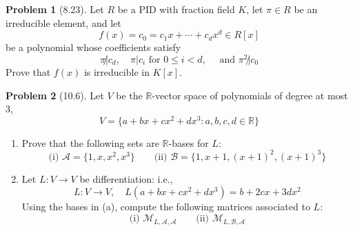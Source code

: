 \documentclass[12pt]{article}
\theoremstyle{definition}
\newtheorem{problem}{Problem}
\begin{document}
\begin{problem}[8.23]
    Let $R$ be a PID with fraction field $K$, let $\pi \in R$ be an irreducible element, and let
    \[
        f(x) = c_0 = c_1x + \cdots + c_dx^d \in R[x]
    \]
    be a polynomial whose coefficients satisfy
    \[
        \pi \not| c_d, \quad \pi | c_i \text{ for } 0 \leq i < d, \quad \text{ and } \pi^2 \not| c_0
    \]
    Prove that $f(x)$ is irreducible in $K[x]$.
    
    \begin{solution}

    \end{solution}
\end{problem}

\begin{problem}[10.6]
    Let $V$ be the $\mathbb{R}$-vector space of polynomials of degree at most 3,
    \[
        V = \{ a + bx + cx^2 + dx^3 : a, b, c, d \in \mathbb{R} \}
    \]
    \begin{enumerate}[label=(\alph*)]
        \item Prove that the following sets are $\mathbb{R}$-bases for $L$:
        \[
            \text{(i) } \mathcal{A} = \{ 1, x, x^2, x^3 \} \quad \quad \text{(ii) } \mathcal{B} = \{ 1, x + 1, (x + 1)^2, (x + 1)^3 \}
        \]
        \begin{solution}

        \end{solution}

        \item Let $L : V \longrightarrow V$ be differentiation: i.e.,
              \[
                    L : V \longrightarrow V, \quad L(a + bx + cx^2 + dx^3) = b + 2cx + 3dx^2
              \]
              Using the bases in (a), compute the following matrices associated to $L$:
              \[
                    \text{(i) } \mathcal{M}_{L, \mathcal{A}, \mathcal{A}} \quad \quad \text{(ii) } \mathcal{M}_{L, \mathcal{B}, \mathcal{A}}
              \]
        \begin{solution}

        \end{solution}
    \end{enumerate}
\end{problem}
\end{document}
